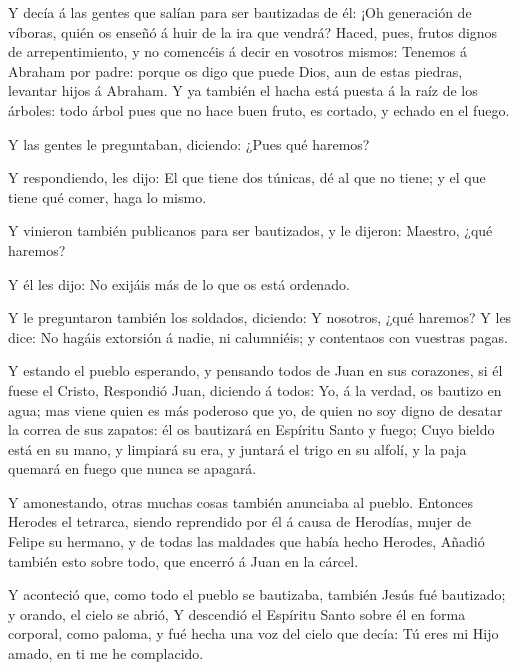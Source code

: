  Y decía á las gentes que salían para ser bautizadas de él:
¡Oh generación de víboras, quién os enseñó á huir de la ira que vendrá?
 Haced, pues, frutos dignos de arrepentimiento, y no
comencéis á decir en vosotros mismos: Tenemos á Abraham por padre:
porque os digo que puede Dios, aun de estas piedras, levantar hijos á
Abraham.  Y ya también el hacha está puesta á la raíz de los
árboles: todo árbol pues que no hace buen fruto, es cortado, y echado en
el fuego.

 Y las gentes le preguntaban, diciendo: ¿Pues qué haremos?

 Y respondiendo, les dijo: El que tiene dos túnicas, dé al
que no tiene; y el que tiene qué comer, haga lo mismo.

 Y vinieron también publicanos para ser bautizados, y le
dijeron: Maestro, ¿qué haremos?

 Y él les dijo: No exijáis más de lo que os está ordenado.

 Y le preguntaron también los soldados, diciendo: Y
nosotros, ¿qué haremos? Y les dice: No hagáis extorsión á nadie, ni
calumniéis; y contentaos con vuestras pagas.

 Y estando el pueblo esperando, y pensando todos de Juan en
sus corazones, si él fuese el Cristo,  Respondió Juan,
diciendo á todos: Yo, á la verdad, os bautizo en agua; mas viene quien
es más poderoso que yo, de quien no soy digno de desatar la correa de
sus zapatos: él os bautizará en Espíritu Santo y fuego; 
Cuyo bieldo está en su mano, y limpiará su era, y juntará el trigo en su
alfolí, y la paja quemará en fuego que nunca se apagará.

 Y amonestando, otras muchas cosas también anunciaba al
pueblo.  Entonces Herodes el tetrarca, siendo reprendido
por él á causa de Herodías, mujer de Felipe su hermano, y de todas las
maldades que había hecho Herodes,  Añadió también esto
sobre todo, que encerró á Juan en la cárcel.

 Y aconteció que, como todo el pueblo se bautizaba, también
Jesús fué bautizado; y orando, el cielo se abrió,  Y
descendió el Espíritu Santo sobre él en forma corporal, como paloma, y
fué hecha una voz del cielo que decía: Tú eres mi Hijo amado, en ti me
he complacido.

